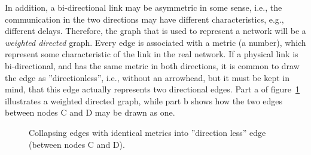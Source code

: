 \documentclass[a4paper]{article}
\newcommand{\ie}{i.e.,\xspace}
\newcommand{\eg}{e.g.,\xspace}
\begin{document}
In addition, a bi-directional link may be asymmetric in some sense, \ie the communication in the two directions may have different characteristics, \eg different delays. Therefore, the graph that is used to represent a network will be a \emph{weighted directed} graph. Every edge is associated with a metric (a number), which represent some characteristic of the link in the real network. If a physical link is bi-directional, and has the same metric in both directions, it is common to draw the edge as ''directionless'', \ie without an arrowhead, but it must be kept in mind, that this edge actually represents two directional edges. Part a of figure~\ref{fig:Graph1de} illustrates a weighted directed graph, while part b shows how the two edges between nodes C and D may be drawn as one.
\begin{figure}[ht]
\centering
\begin{subfigure}{.4\textwidth}
\end{subfigure}
\hspace{1cm}
\begin{subfigure}{.4\textwidth}
\end{subfigure}
\caption{\label{fig:Graph1de}Collapsing edges with identical metrics into ''direction less'' edge (between nodes C and D).}
\end{figure}
\end{document}
